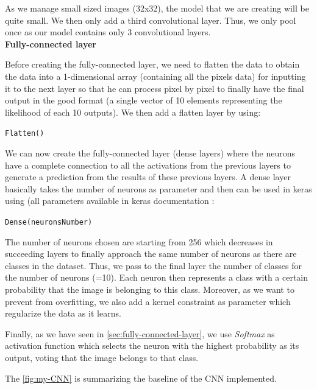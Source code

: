 \documentclass[11pt, openany]{report}
\theoremstyle{plain}
\theoremstyle{definition}
\theoremstyle{remark}
\begin{document}
As we manage small sized images (32x32), the model that we are creating will be quite small. We then only add a third convolutional layer. Thus, we only pool once as our model contains only 3 convolutional layers. \\ 

\textbf{Fully-connected layer}

Before creating the fully-connected layer, we need to flatten the data to obtain the data into a 1-dimensional array (containing all the pixels data) for inputting it to the next layer so that he can process pixel by pixel to finally have the final output in the good format (a single vector of 10 elements representing the likelihood of each 10 outputs). We then add a flatten layer by using: 
\begin{center}
\texttt{Flatten()}
\end{center}

We can now create the fully-connected layer (dense layers) where the neurons have a complete connection to all the activations from the previous layers to generate a prediction from the results of these previous layers. A dense layer basically takes the number of neurons as parameter and then can be used in keras using (all parameters available in keras documentation \cite{keras-doc}:
\begin{center}
\texttt{Dense(neuronsNumber)}
\end{center}
The number of neurons chosen are starting from 256 which decreases in succeeding layers to finally approach the same number of neurons as there are classes in the dataset. Thus, we pass to the final layer the number of classes for the number of neurons (=10). Each neuron then represents a class with a certain probability that the image is belonging to this class. Moreover, as we want to prevent from overfitting, we also add a kernel constraint as parameter which regularize the data as it learns. 

Finally, as we have seen in \autoref{sec:fully-connected-layer}, we use \textit{Softmax} as activation function which selects the neuron with the highest probability as its output, voting that the image belongs to that class. 

The \autoref{fig:my-CNN} is summarizing the baseline of the CNN implemented. 
\end{document}
